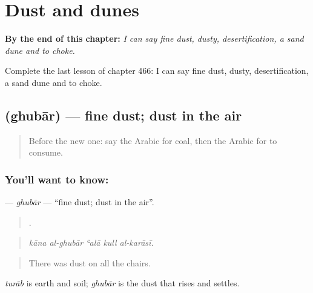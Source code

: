 
\chapter{Dust and dunes}
\label{ch:ar-dust-and-dunes}

\begin{chapteropening}
\textbf{By the end of this chapter:} \emph{I can say fine dust, dusty, desertification, a sand dune and to choke.}

Complete the last lesson of chapter 466: I can say fine dust, dusty, desertification, a sand dune and to choke.
\end{chapteropening}

\section[\texorpdfstring{\ar{غبار} (ghubār)}{غبار (ghubār)}]{ (ghubār) — fine dust; dust in the air}

\label{lesson:AR-C466-ghubar}



\begin{quote}
Before the new one: say the Arabic for coal, then the Arabic for to consume.
\end{quote}

\subsection*{You'll want to know: }
\textbf{} — \emph{ghubār} — \textquotedblleft{}fine dust; dust in the air\textquotedblright{}.

\begin{quote}
    .
\end{quote}

\begin{quote}
\emph{kāna al-ghubār ʿalā kull al-karāsī.}
\end{quote}

\begin{quote}
There was dust on all the chairs.
\end{quote}

\emph{turāb} is earth and soil; \emph{ghubār} is the dust that rises and settles.

